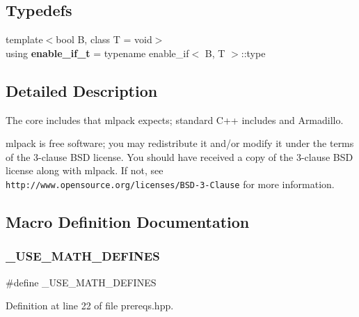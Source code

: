 \subsection*{Typedefs}
\begin{DoxyCompactItemize}
\item 
{\footnotesize template$<$bool B, class T  = void$>$ }\\using \textbf{ enable\+\_\+if\+\_\+t} = typename enable\+\_\+if$<$ B, T $>$\+::type
\end{DoxyCompactItemize}


\subsection{Detailed Description}
The core includes that mlpack expects; standard C++ includes and Armadillo. 

mlpack is free software; you may redistribute it and/or modify it under the terms of the 3-\/clause B\+SD license. You should have received a copy of the 3-\/clause B\+SD license along with mlpack. If not, see {\tt http\+://www.\+opensource.\+org/licenses/\+B\+S\+D-\/3-\/\+Clause} for more information. 

\subsection{Macro Definition Documentation}
\mbox{\label{prereqs_8hpp_a525335710b53cb064ca56b936120431e}} 
\subsubsection{\+\_\+\+U\+S\+E\+\_\+\+M\+A\+T\+H\+\_\+\+D\+E\+F\+I\+N\+ES}
{\footnotesize\ttfamily \#define \+\_\+\+U\+S\+E\+\_\+\+M\+A\+T\+H\+\_\+\+D\+E\+F\+I\+N\+ES}



Definition at line 22 of file prereqs.\+hpp.

\mbox{\label{prereqs_8hpp_a5cfc0a80bcb9c742a4dd13252e8e70b2}} 
